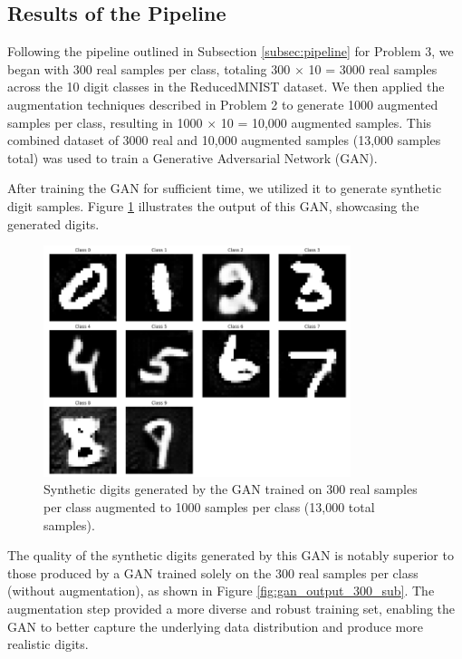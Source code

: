 \documentclass[12pt]{article}
\begin{document}
\subsection{Results of the Pipeline}

Following the pipeline outlined in Subsection \ref{subsec:pipeline} for Problem 3, we began with 300 real samples per class, totaling 300 $\times$ 10 = 3000 real samples across the 10 digit classes in the ReducedMNIST dataset. We then applied the augmentation techniques described in Problem 2 to generate 1000 augmented samples per class, resulting in 1000 $\times$ 10 = 10,000 augmented samples. This combined dataset of 3000 real and 10,000 augmented samples (13,000 samples total) was used to train a Generative Adversarial Network (GAN).

After training the GAN for sufficient time, we utilized it to generate synthetic digit samples. Figure \ref{fig:gan_augmented_output} illustrates the output of this GAN, showcasing the generated digits.

\begin{figure}[h]
    \centering
    \includegraphics[width=0.8\textwidth]{300_GAN_Augmented_Output.png}
    \caption{Synthetic digits generated by the GAN trained on 300 real samples per class augmented to 1000 samples per class (13,000 total samples).}
    \label{fig:gan_augmented_output}
\end{figure}

The quality of the synthetic digits generated by this GAN is notably superior to those produced by a GAN trained solely on the 300 real samples per class (without augmentation), as shown in Figure \ref{fig:gan_output_300_sub}. The augmentation step provided a more diverse and robust training set, enabling the GAN to better capture the underlying data distribution and produce more realistic digits.
\end{document}

